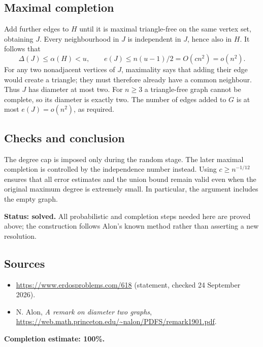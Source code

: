 \subsection*{Maximal completion}
Add further edges to $H$ until it is maximal triangle-free on the same vertex set, obtaining $J$. Every neighbourhood in $J$ is independent in $J$, hence also in $H$. It follows that
\[
 \Delta(J)\le\alpha(H)<u,\qquad
 e(J)\le n(u-1)/2=O(cn^2)=o(n^2).
\]
For any two nonadjacent vertices of $J$, maximality says that adding their edge would create a triangle; they must therefore already have a common neighbour. Thus $J$ has diameter at most two. For $n\ge3$ a triangle-free graph cannot be complete, so its diameter is exactly two. The number of edges added to $G$ is at most $e(J)=o(n^2)$, as required.

\subsection*{Checks and conclusion}
The degree cap is imposed only during the random stage. The later maximal completion is controlled by the independence number instead. Using $c\ge n^{-1/12}$ ensures that all error estimates and the union bound remain valid even when the original maximum degree is extremely small. In particular, the argument includes the empty graph.

\textbf{Status: solved.} All probabilistic and completion steps needed here are proved above; the construction follows Alon's known method rather than asserting a new resolution.

\subsection*{Sources}
\begin{itemize}
\item \url{https://www.erdosproblems.com/618} (statement, checked 24 September 2026).
\item N. Alon, \emph{A remark on diameter two graphs}, \url{https://web.math.princeton.edu/~nalon/PDFS/remark1901.pdf}.
\end{itemize}
\noindent\textbf{Completion estimate: 100\%.}
